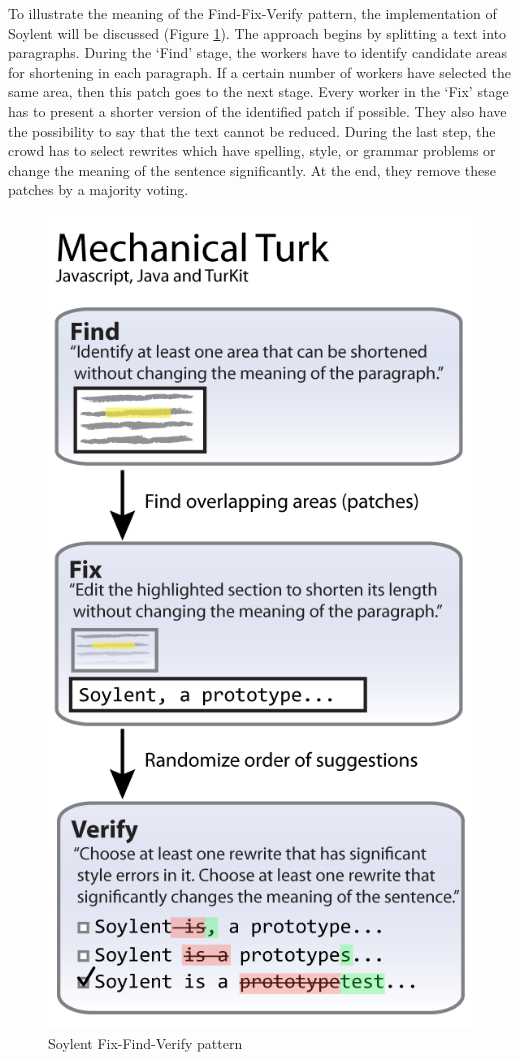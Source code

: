 To illustrate the meaning of the Find-Fix-Verify pattern, the implementation of Soylent will be discussed (Figure \ref{fixfindverify}). The approach begins by splitting a text into paragraphs. During the `Find' stage, the workers have to identify candidate areas for shortening in each paragraph. If a certain number of workers have selected the same area, then this patch goes to the next stage. Every worker in the `Fix' stage has to present a shorter version of the identified patch if possible. They also have the possibility to say that the text cannot be reduced. During the last step, the crowd has to select rewrites which have spelling, style, or grammar problems or change the meaning of the sentence significantly. At the end, they remove these patches by a majority voting.
\begin{figure}[h!]
\centering
\includegraphics[scale=0.35]{images/soylent_system_overview.png}
\caption{Soylent Fix-Find-Verify pattern}
\label{fixfindverify}
\end{figure}

